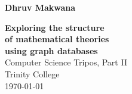 \pagestyle{empty}

\hfill{\Large \bf Dhruv Makwana}

\vspace*{60mm}
\begin{center}
\Huge
{\bf Exploring the structure \\ of mathematical theories \\ using graph databases} \\
\vspace*{5mm}
Computer Science Tripos, Part II \\
\vspace*{5mm}
Trinity College \\
\vspace*{5mm}
\today
\end{center}
